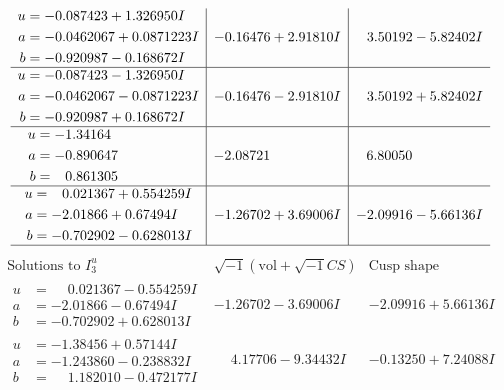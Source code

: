 \documentclass[1p]{elsarticle_modified}
\theoremstyle{definition}
\newcommand{\I}{\sqrt{-1}}
\begin{document}
$$\begin{array}{c|c|c}
\begin{aligned}
u &= -0.087423 + 1.326950 I \\
a &= -0.0462067 + 0.0871223 I \\
b &= -0.920987 - 0.168672 I\end{aligned}
 & -0.16476 + 2.91810 I & \phantom{-}3.50192 - 5.82402 I \\ \hline\begin{aligned}
u &= -0.087423 - 1.326950 I \\
a &= -0.0462067 - 0.0871223 I \\
b &= -0.920987 + 0.168672 I\end{aligned}
 & -0.16476 - 2.91810 I & \phantom{-}3.50192 + 5.82402 I \\ \hline\begin{aligned}
u &= -1.34164\phantom{ +0.000000I} \\
a &= -0.890647\phantom{ +0.000000I} \\
b &= \phantom{-}0.861305\phantom{ +0.000000I}\end{aligned}
 & -2.08721\phantom{ +0.000000I} & \phantom{-}6.80050\phantom{ +0.000000I} \\ \hline\begin{aligned}
u &= \phantom{-}0.021367 + 0.554259 I \\
a &= -2.01866 + 0.67494 I \\
b &= -0.702902 - 0.628013 I\end{aligned}
 & -1.26702 + 3.69006 I & -2.09916 - 5.66136 I\\
 \hline 
 \end{array}$$\newpage$$\begin{array}{c|c|c}  
\text{Solutions to }I^u_{3}& \I (\text{vol} + \sqrt{-1}CS) & \text{Cusp shape}\\
 \hline 
\begin{aligned}
u &= \phantom{-}0.021367 - 0.554259 I \\
a &= -2.01866 - 0.67494 I \\
b &= -0.702902 + 0.628013 I\end{aligned}
 & -1.26702 - 3.69006 I & -2.09916 + 5.66136 I \\ \hline\begin{aligned}
u &= -1.38456 + 0.57144 I \\
a &= -1.243860 - 0.238832 I \\
b &= \phantom{-}1.182010 - 0.472177 I\end{aligned}
 & \phantom{-}4.17706 - 9.34432 I & -0.13250 + 7.24088 I \\ \hline\begin{aligned}

\end{aligned}
\end{array}$$
\end{document}
